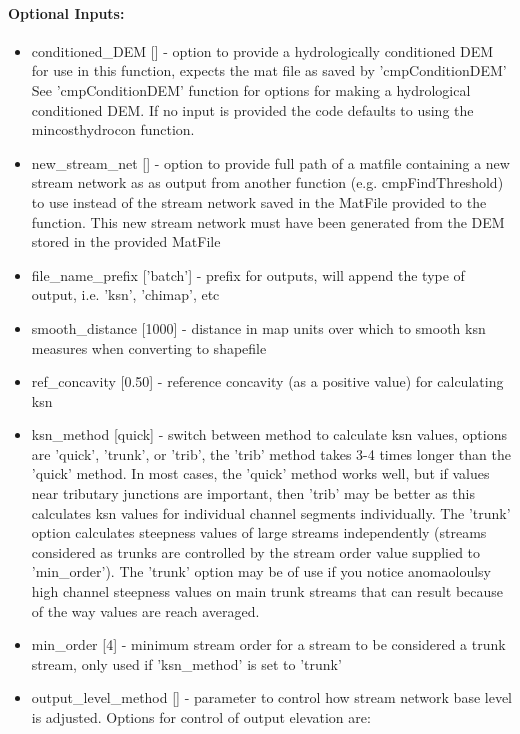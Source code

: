 \paragraph{Optional Inputs:}
\begin{itemize}
\item conditioned\_DEM [] - option to provide a hydrologically conditioned DEM for use in this function, expects the mat file as saved by 'cmpConditionDEM'
See 'cmpConditionDEM' function for options for making a hydrological conditioned DEM. If no input is provided the code defaults to using the 
mincosthydrocon function.
\item new\_stream\_net [] - option to provide full path of a matfile containing a new stream network as as output from another function (e.g. cmpFindThreshold) to use
instead of the stream network saved in the MatFile provided to the function. This new stream network must have been generated from the
DEM stored in the provided MatFile
\item file\_name\_prefix ['batch'] - prefix for outputs, will append the type of output, i.e. 'ksn', 'chimap', etc
\item smooth\_distance [1000] - distance in map units over which to smooth ksn measures when converting to shapefile
\item ref\_concavity [0.50] - reference concavity (as a positive value) for calculating ksn
\item ksn\_method [quick] - switch between method to calculate ksn values, options are 'quick', 'trunk', or 'trib', the 'trib' method takes 3-4 times longer 
than the 'quick' method. In most cases, the 'quick' method works well, but if values near tributary junctions are important, then 'trib'
may be better as this calculates ksn values for individual channel segments individually. The 'trunk' option calculates steepness values
of large streams independently (streams considered as trunks are controlled by the stream order value supplied to 'min\_order'). The 'trunk' option
may be of use if you notice anomaoloulsy high channel steepness values on main trunk streams that can result because of the way values are reach
averaged.
\item min\_order [4] - minimum stream order for a stream to be considered a trunk stream, only used if 'ksn\_method' is set to 'trunk'
\item output\_level\_method [] - parameter to control how stream network base level is adjusted. Options for control of output elevation are:
\begin{itemize}

\end{itemize}
\end{itemize}
